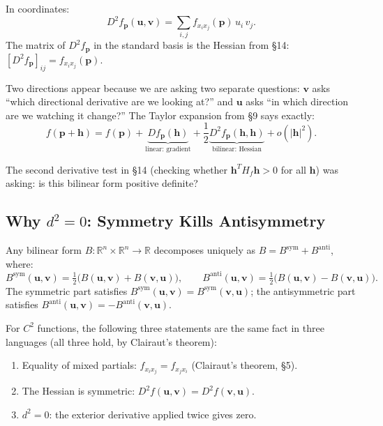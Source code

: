 \documentclass[11pt]{report}
\newcommand{\R}{\mathbb{R}}
\begin{document}
\begin{proposition}
In coordinates:
\[
D^2f_{\mathbf{p}}(\mathbf{u}, \mathbf{v}) = \sum_{i,j} f_{x_i x_j}(\mathbf{p})\, u_i\, v_j.
\]
The matrix of $D^2f_{\mathbf{p}}$ in the standard basis is the Hessian from \S14: $[D^2f_{\mathbf{p}}]_{ij} = f_{x_i x_j}(\mathbf{p})$.
\end{proposition}

Two directions appear because we are asking two separate questions: $\mathbf{v}$ asks ``which directional derivative are we looking at?'' and $\mathbf{u}$ asks ``in which direction are we watching it change?'' The Taylor expansion from \S9 says exactly:
\[
f(\mathbf{p}+\mathbf{h}) = f(\mathbf{p}) + \underbrace{Df_{\mathbf{p}}(\mathbf{h})}_{\text{linear: gradient}} + \frac{1}{2}\underbrace{D^2f_{\mathbf{p}}(\mathbf{h}, \mathbf{h})}_{\text{bilinear: Hessian}} + o(|\mathbf{h}|^2).
\]

The second derivative test in \S14 (checking whether $\mathbf{h}^T H_f \mathbf{h} > 0$ for all $\mathbf{h}$) was asking: is this bilinear form positive definite?

\subsection*{Why $d^2 = 0$: Symmetry Kills Antisymmetry}

\begin{proposition}
Any bilinear form $B: \R^n \times \R^n \to \R$ decomposes uniquely as $B = B^{\mathrm{sym}} + B^{\mathrm{anti}}$, where:
\[
B^{\mathrm{sym}}(\mathbf{u}, \mathbf{v}) = \tfrac{1}{2}\big(B(\mathbf{u}, \mathbf{v}) + B(\mathbf{v}, \mathbf{u})\big), \qquad B^{\mathrm{anti}}(\mathbf{u}, \mathbf{v}) = \tfrac{1}{2}\big(B(\mathbf{u}, \mathbf{v}) - B(\mathbf{v}, \mathbf{u})\big).
\]
The symmetric part satisfies $B^{\mathrm{sym}}(\mathbf{u}, \mathbf{v}) = B^{\mathrm{sym}}(\mathbf{v}, \mathbf{u})$; the antisymmetric part satisfies $B^{\mathrm{anti}}(\mathbf{u}, \mathbf{v}) = -B^{\mathrm{anti}}(\mathbf{v}, \mathbf{u})$.
\end{proposition}

\begin{proposition}[$d^2 = 0$ Is Clairaut's Theorem in Forms Language]
\label{prop:d2-clairaut}
For $C^2$ functions, the following three statements are the same fact in three languages (all three hold, by Clairaut's theorem):
\begin{enumerate}
    \item Equality of mixed partials: $f_{x_i x_j} = f_{x_j x_i}$ (Clairaut's theorem, \S5).
    \item The Hessian is symmetric: $D^2f(\mathbf{u}, \mathbf{v}) = D^2f(\mathbf{v}, \mathbf{u})$.
    \item $d^2 = 0$: the exterior derivative applied twice gives zero.
\end{enumerate}
\end{proposition}
\end{document}
